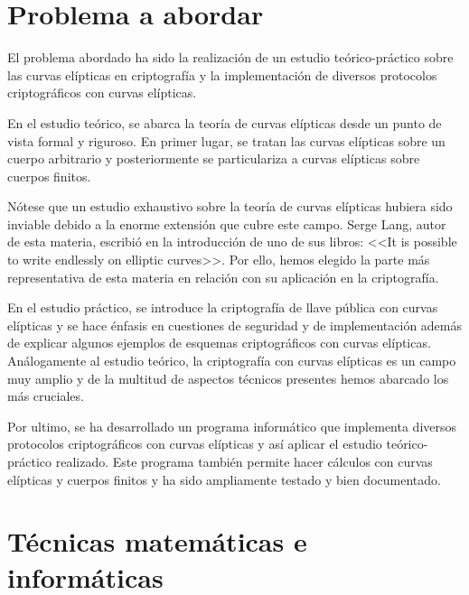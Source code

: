 \section{Problema a abordar}
\label{sub:Problema a abordar}


El problema abordado ha sido la realización de un estudio teórico-práctico sobre las curvas elípticas en criptografía y la implementación de diversos protocolos criptográficos con curvas elípticas.

En el estudio teórico, se abarca la teoría de curvas elípticas desde un punto de vista formal y riguroso. En primer lugar, se tratan las curvas elípticas sobre un cuerpo arbitrario y posteriormente se particulariza a curvas elípticas sobre cuerpos finitos.

Nótese que un estudio exhaustivo sobre la teoría de curvas elípticas hubiera sido inviable debido a la enorme extensión que cubre este campo. Serge Lang, autor de esta materia, escribió en la introducción de uno de sus libros: <<It is possible to write endlessly on elliptic curves>>. Por ello, hemos elegido la parte más representativa de esta materia en relación con su aplicación en la criptografía.

En el estudio práctico, se introduce la criptografía de llave pública con curvas elípticas y se hace énfasis en cuestiones de seguridad y de implementación además de explicar algunos ejemplos de esquemas criptográficos con curvas elípticas. Análogamente al estudio teórico, la criptografía con curvas elípticas es un campo muy amplio y de la multitud de aspectos técnicos presentes hemos abarcado los más cruciales.

Por ultimo, se ha desarrollado un programa informático que implementa diversos protocolos criptográficos con curvas elípticas y así aplicar el estudio teórico-práctico realizado. Este programa también permite hacer cálculos con curvas elípticas y cuerpos finitos y ha sido ampliamente testado y bien documentado.

\section{Técnicas matemáticas e informáticas}
\label{sub:Técnicas matemáticas e informáticas}


